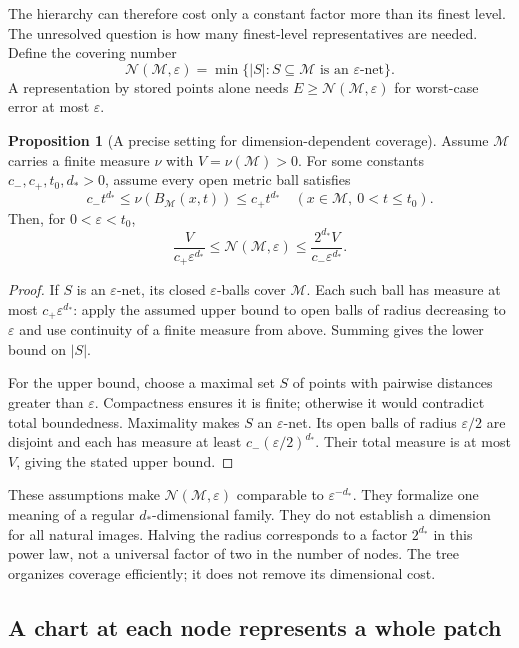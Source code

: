 \documentclass[11pt,a4paper]{article}
\theoremstyle{definition}
\newtheorem{proposition}[theorem]{Proposition}
\theoremstyle{definition}
\theoremstyle{remark}\newtheorem{remark}[theorem]{Remark}
\begin{document}
The hierarchy can therefore cost only a constant factor more than its finest level. The unresolved question is how many finest-level representatives are needed. Define the covering number
\[
\mathcal N(\mathcal M,\varepsilon)
=\min\bigl\{|S|:S\subseteq\mathcal M\text{ is an }\varepsilon\text{-net}\bigr\}.
\]
A representation by stored points alone needs $E\ge\mathcal N(\mathcal M,\varepsilon)$ for worst-case error at most $\varepsilon$.

\begin{proposition}[A precise setting for dimension-dependent coverage]\label{prop:coverdimension}
Assume $\mathcal M$ carries a finite measure $\nu$ with $V=\nu(\mathcal M)>0$. For some constants $c_-,c_+,t_0,d_*>0$, assume every open metric ball satisfies
\[
c_-t^{d_*}\le\nu(B_{\mathcal M}(x,t))\le c_+t^{d_*}
\quad(x\in\mathcal M,\ 0<t\le t_0).
\]
Then, for $0<\varepsilon<t_0$,
\[
\frac{V}{c_+\varepsilon^{d_*}}
\le\mathcal N(\mathcal M,\varepsilon)
\le\frac{2^{d_*}V}{c_-\varepsilon^{d_*}}.
\]
\end{proposition}
\begin{proof}
If $S$ is an $\varepsilon$-net, its closed $\varepsilon$-balls cover $\mathcal M$. Each such ball has measure at most $c_+\varepsilon^{d_*}$: apply the assumed upper bound to open balls of radius decreasing to $\varepsilon$ and use continuity of a finite measure from above. Summing gives the lower bound on $|S|$.

For the upper bound, choose a maximal set $S$ of points with pairwise distances greater than $\varepsilon$. Compactness ensures it is finite; otherwise it would contradict total boundedness. Maximality makes $S$ an $\varepsilon$-net. Its open balls of radius $\varepsilon/2$ are disjoint and each has measure at least $c_-(\varepsilon/2)^{d_*}$. Their total measure is at most $V$, giving the stated upper bound.
\end{proof}

These assumptions make $\mathcal N(\mathcal M,\varepsilon)$ comparable to $\varepsilon^{-d_*}$. They formalize one meaning of a regular $d_*$-dimensional family. They do not establish a dimension for all natural images. Halving the radius corresponds to a factor $2^{d_*}$ in this power law, not a universal factor of two in the number of nodes. The tree organizes coverage efficiently; it does not remove its dimensional cost.

\subsection{A chart at each node represents a whole patch}
\end{document}
